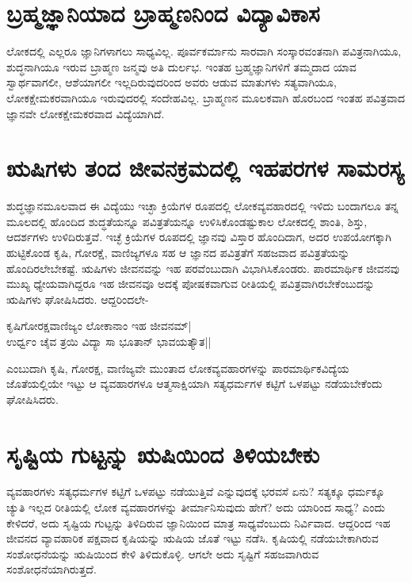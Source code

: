\section*{ಬ್ರಹ್ಮಜ್ಞಾನಿಯಾದ ಬ್ರಾಹ್ಮ‌ಣನಿಂದ ವಿದ್ಯಾವಿಕಾಸ}

ಲೋಕದಲ್ಲಿ ಎಲ್ಲರೂ ಜ್ಞಾನಿಗಳಾಗಲು ಸಾಧ್ಯವಿಲ್ಲ. ಪೂರ್ವಕರ್ಮಾನು ಸಾರವಾಗಿ ಸಂಸ್ಕಾರವಂತನಾಗಿ ಪವಿತ್ರನಾಗಿಯೂ, ಶುದ್ಧನಾಗಿಯೂ ಇರುವ ಬ್ರಾಹ್ಮಣ ಜನ್ಮವು ಅತಿ ದುರ್ಲಭ. ಇಂತಹ ಬ್ರಹ್ಮಜ್ಞಾನಿಗಳಿಗೆ ತಮ್ಮದಾದ ಯಾವ ಸ್ವಾರ್ಥವಾಗಲೀ, ಆಶೆಯಾಗಲೀ ಇಲ್ಲದಿರುವುದರಿಂದ ಅವರು ಆಡುವ ಮಾತುಗಳು ಸತ್ಯವಾಗಿಯೂ, ಲೋಕಕ್ಷೇಮಕರವಾಗಿಯೂ ಇರುವುದರಲ್ಲಿ ಸಂದೇಹವಿಲ್ಲ. ಬ್ರಾಹ್ಮಣನ ಮೂಲಕವಾಗಿ ಹೊರಬಂದ ಇಂತಹ ಪವಿತ್ರವಾದ ಜ್ಞಾನವೇ ಲೋಕಕ್ಷೇಮಕರವಾದ ವಿದ್ಯೆಯಾಗಿದೆ.

\section*{ಋಷಿಗಳು ತಂದ ಜೀವನಕ್ರಮದಲ್ಲಿ ಇಹಪರಗಳ ಸಾಮರಸ್ಯ}

ಶುದ್ಧಜ್ಞಾನಮೂಲವಾದ ಈ ವಿದ್ಯೆಯು ಇಚ್ಛಾ ಕ್ರಿಯೆಗಳ ರೂಪದಲ್ಲಿ ಲೋಕವ್ಯವಹಾರದಲ್ಲಿ ಇಳಿದು ಬಂದಾಗಲೂ ತನ್ನ ಮೂಲದಲ್ಲಿ ಹೊಂದಿದ ಶುದ್ಧತೆಯನ್ನೂ ಪವಿತ್ರತೆಯನ್ನೂ ಉಳಿಸಿಕೊಂಡಷ್ಟುಕಾಲ ಲೋಕದಲ್ಲಿ ಶಾಂತಿ, ಶಿಸ್ತು, ಆದರ್ಶಗಳು ಉಳಿದಿರುತ್ತವೆ. ಇಚ್ಛೆ ಕ್ರಿಯೆಗಳ ರೂಪದಲ್ಲಿ ಜ್ಞಾನವು ವಿಸ್ತಾರ ಹೊಂದಿದಾಗ, ಅದರ ಉಪಯೋಗಕ್ಕಾಗಿ ಹುಟ್ಟಿಕೊಂಡ ಕೃಷಿ, ಗೋರಕ್ಷೆ, ವಾಣಿಜ್ಯಗಳೂ ಸಹ ಆ ಜ್ಞಾನದ ಪವಿತ್ರತೆಗೆ ಸಹಜವಾದ ಪವಿತ್ರತೆಯನ್ನು ಹೊಂದಿರಲೇಬೇಕಷ್ಟೆ. ಋಷಿಗಳು ಜೀವನವನ್ನು ಇಹ ಪರವೆಂಬುದಾಗಿ ವಿಭಾಗಿಸಿಕೊಂಡರು. ಪಾರಮಾರ್ಥಿಕ ಜೀವನವು ಮುಖ್ಯ ಧ್ಯೇಯವಾಗಿದ್ದರೂ ಇಹ ಜೀವನವೂ ಅದಕ್ಕೆ ಪೋಷಕವಾಗುವ ರೀತಿಯಲ್ಲಿ ಪವಿತ್ರವಾಗಿರಬೇಕೆಂಬುದನ್ನು ಋಷಿಗಳು ಘೋಷಿಸಿದರು. ಆದ್ದರಿಂದಲೇ-

\begin{shloka}
ಕೃಷಿಗೋರಕ್ಷವಾಣಿಜ್ಯಂ ಲೋಕಾನಾಂ ಇಹ ಜೀವನಮ್|\\
ಉರ್ಧ್ವಂ ಚೈವ ತ್ರಯಿ ವಿದ್ಯಾ ಸಾ ಭೂತಾನ್ ಭಾವಯತ್ಯೌತ||
\end{shloka}

ಎಂಬುದಾಗಿ ಕೃಷಿ, ಗೋರಕ್ಷ, ವಾಣಿಜ್ಯವೇ ಮುಂತಾದ ಲೋಕವ್ಯವಹಾರಗಳನ್ನು ಪಾರಮಾರ್ಥಿಕವಿದ್ಯೆಯ ಜೊತೆಯಲ್ಲಿಯೇ ಇಟ್ಟು ಆ ವ್ಯವಹಾರಗಳೂ ಆತ್ಮಸಾಕ್ಷಿಯಾಗಿ ಸತ್ಯಧರ್ಮಗಳ ಕಟ್ಟಿಗೆ ಒಳಪಟ್ಟು ನಡೆಯಬೇಕೆಂದು ಘೋಷಿಸಿದರು.

\section*{ಸೃಷ್ಟಿಯ ಗುಟ್ಟನ್ನು ಋಷಿಯಿಂದ ತಿಳಿಯಬೇಕು}

ವ್ಯವಹಾರಗಳು ಸತ್ಯಧರ್ಮಗಳ ಕಟ್ಟಿಗೆ ಒಳಪಟ್ಟು ನಡೆಯುತ್ತಿವೆ ಎನ್ನುವುದಕ್ಕೆ ಭರವಸೆ ಏನು? ಸತ್ಯಕ್ಕೂ ಧರ್ಮಕ್ಕೂ ಚ್ಯುತಿ ಇಲ್ಲದ ರೀತಿಯಲ್ಲಿ ಲೋಕ ವ್ಯವಹಾರಗಳನ್ನು ತೀರ್ಮಾನಿಸುವುದು ಹೇಗೆ? ಅದು ಯಾರಿಂದ ಸಾಧ್ಯ? ಎಂದು ಕೇಳಿದರೆ, ಅದು ಸೃಷ್ಟಿಯ ಗುಟ್ಟನ್ನು ತಿಳಿದಿರುವ ಜ್ಞಾನಿಯಿಂದ ಮಾತ್ರ ಸಾಧ್ಯವೆಂಬುದು ನಿರ್ವಿವಾದ. ಆದ್ದರಿಂದ ಇಹ ಜೀವನದ ವ್ಯಾವಹಾರಿಕ ಪಕ್ಷವಾದ ಕೃಷಿಯನ್ನು ಋಷಿಯ ಜೊತೆ ಇಟ್ಟು ನಡೆಸಿ. ಕೃಷಿಯಲ್ಲಿ ನಡೆಯಬೇಕಾಗಿರುವ ಸಂಶೋಧನೆಯನ್ನು ಋಷಿಯಿಂದ ಕೇಳಿ ತಿಳಿದುಕೊಳ್ಳಿ. ಆಗಲೇ ಅದು ಸೃಷ್ಟಿಗೆ ಸಹಜವಾಗಿರುವ ಸಂಶೋಧನೆಯಾಗಿರುತ್ತದೆ.

